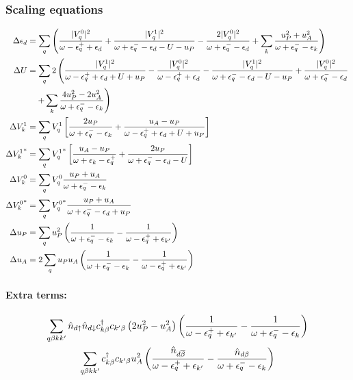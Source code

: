 \documentclass[14pt]{extarticle}
\numberwithin{equation}{section}
\begin{document}
{{\subsubsection{Scaling equations}
\begin{equation}\begin{aligned}
	\Delta \epsilon_d &= \sum_q \left({\frac{|V_q^0|^2}{\omega - \epsilon_q^+ + \epsilon_d } + \frac{|V_q^1|^2}{\omega + \epsilon^-_q - \epsilon_d  - U - u_P} - \frac{2|V_q^0|^2}{\omega + \epsilon^-_q - \epsilon_d} + \sum_k\frac{u_P^2 + u_A^2}{\omega + \epsilon_q^- - \epsilon_k}}\right)\\
	\Delta U &= \sum_q 2\left(\frac{|V_q^1|^2}{\omega - \epsilon_q^+ + \epsilon_d + U + u_P} - \frac{|V_q^0|^2}{\omega - \epsilon_q^+ + \epsilon_d} - \frac{|V_q^1|^2}{\omega + \epsilon^-_q - \epsilon_d  - U - u_P} +\frac{|V_q^0|^2}{\omega + \epsilon^-_q - \epsilon_d} \right.\\
		 &\quad\left.+\sum_k \frac{4u_P^2 - 2u_A^2}{\omega + \epsilon_q^- - \epsilon_k}\right)\\
\Delta V_k^1 &=\sum_q V_q^1\left[{\frac{2u_P}{\omega + \epsilon_q^- - \epsilon_{k}} + \frac{u_A - u_P}{\omega - \epsilon_q^+ + \epsilon_d + U + u_P}}\right] \\
\Delta {V_k^1}^* &= \sum_q  {V_q^1}^*\left[{\frac{u_A - u_P}{\omega + \epsilon_k - \epsilon_q^+} + \frac{2u_P}{\omega + \epsilon_q^- - \epsilon_d - U}}\right]\\
\Delta V_k^0 &= \sum_q V_q^0\frac{u_P + u_A}{\omega + \epsilon_q^- - \epsilon_{k}}\\
\Delta {V_k^0}^* &=\sum_q {V_q^0}^* \frac{u_P + u_A}{\omega + \epsilon_q^- - \epsilon_d + u_P}\\
\Delta u_P &= \sum_qu_P^2\left({\frac{1}{\omega + \epsilon_q^-  - \epsilon_{k}} - \frac{1}{\omega - \epsilon_q^+  + \epsilon_{k^\prime}}}\right)\\
\Delta u_A &= 2 \sum_qu_P u_A \left({\frac{1}{\omega + \epsilon_q^-  - \epsilon_{k}} - \frac{1}{\omega - \epsilon_q^+  + \epsilon_{k^\prime}}}\right)\\
\end{aligned}\end{equation}
\paragraph{Extra terms:}
\begin{gather*}
	\sum_{q\beta k k^\prime}\hat n_{d\uparrow}\hat n_{d\downarrow}c^\dagger_{k\beta}c_{k^\prime\beta}\left({2u_P^2 - u_A^2}\right)\left({\frac{1}{\omega - \epsilon_q^+ + \epsilon_{k^\prime}} - \frac{1}{\omega + \epsilon_q^- - \epsilon_{k}}}\right)\\
	\sum_{q\beta k k^\prime}c^\dagger_{k\beta}c_{k^\prime\beta}u_A^2\left({\frac{\hat n_{d\overline\beta}}{\omega - \epsilon_q^+ + \epsilon_{k^\prime}} - \frac{\hat n_{d\beta}}{\omega + \epsilon_q^- - \epsilon_{k}}}\right)
\end{gather*}

}}
\end{document}
